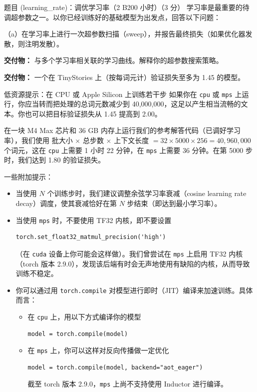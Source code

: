 \begin{problembox}{题目 (learning\_rate)：调优学习率（2 B200 小时）（3 分）}
学习率是最重要的待调超参数之一。以你已经训练好的基础模型为出发点，回答以下问题：

\medskip
（a）在学习率上进行一次超参数扫描（sweep），并报告最终损失（如果优化器发散，则注明发散）。

\begin{deliverablebox}
\textbf{交付物：} 与多个学习率相关联的学习曲线。解释你的超参数搜索策略。
\end{deliverablebox}

\begin{deliverablebox}
\textbf{交付物：} 一个在 TinyStories 上（按每词元计）验证损失至多为 1.45 的模型。
\end{deliverablebox}

\begin{tipbox}{低资源提示：在 CPU 或 Apple Silicon 上训练若干步}
如果你在 \texttt{cpu} 或 \texttt{mps} 上运行，你应当转而把处理的总词元数减少到 40{,}000{,}000，这足以产生相当流畅的文本。你也可以把目标验证损失从 1.45 提高到 2.00。

在一块 M4 Max 芯片和 36 GB 内存上运行我们的参考解答代码（已调好学习率），我们使用 批大小 $\times$ 总步数 $\times$ 上下文长度 $= 32 \times 5000 \times 256 = 40{,}960{,}000$ 个词元，这在 \texttt{cpu} 上需要 1 小时 22 分钟，在 \texttt{mps} 上需要 36 分钟。在第 5000 步时，我们达到 1.80 的验证损失。

一些附加提示：
\begin{itemize}
  \item 当使用 $N$ 个训练步时，我们建议调整余弦学习率衰减（cosine learning rate decay）调度，使其衰减恰好在第 $N$ 步结束（即达到最小学习率）。
  \item 当使用 \texttt{mps} 时，不要使用 TF32 内核，即不要设置
\begin{lstlisting}
torch.set_float32_matmul_precision('high')
\end{lstlisting}
  （在 \texttt{cuda} 设备上你可能会这样做）。我们曾尝试在 \texttt{mps} 上启用 TF32 内核（torch 版本 2.9.0），发现该后端有时会无声地使用有缺陷的内核，从而导致训练不稳定。
  \item 你可以通过用 \texttt{torch.compile} 对模型进行即时（JIT）编译来加速训练。具体而言：
  \begin{itemize}
    \item 在 \texttt{cpu} 上，用以下方式编译你的模型
\begin{lstlisting}
model = torch.compile(model)
\end{lstlisting}
    \item 在 \texttt{mps} 上，你可以这样对反向传播做一定优化
\begin{lstlisting}
model = torch.compile(model, backend="aot_eager")
\end{lstlisting}
    截至 torch 版本 2.9.0，\texttt{mps} 上尚不支持使用 Inductor 进行编译。
  \end{itemize}
\end{itemize}
\end{tipbox}


\end{problembox}
